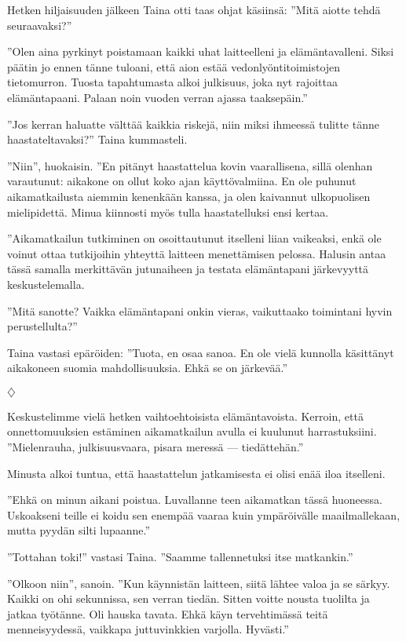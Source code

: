 ﻿\documentclass[a4paper, 12pt, finnish]{article}
\newcommand{\q}[1]{''#1''}
\newcommand{\openq}[1]{''#1} %
\def\jump{\vspace{2mm} \centerline{$\diamondsuit$} \vspace{2mm}}
\begin{document}
Hetken hiljaisuuden jälkeen Taina otti taas ohjat käsiinsä:
\q{Mitä aiotte tehdä seuraavaksi?}

\q{Olen aina pyrkinyt poistamaan kaikki uhat laitteelleni
ja elämäntavalleni. Siksi päätin jo ennen tänne tuloani, että
aion estää vedonlyöntitoimistojen tietomurron. Tuosta
tapahtumasta alkoi julkisuus, joka nyt rajoittaa elämäntapaani.
Palaan noin vuoden verran ajassa taaksepäin.}

\q{Jos kerran haluatte välttää kaikkia riskejä, niin miksi
ihmeessä tulitte tänne haastateltavaksi?} Taina kummasteli.

\q{Niin}, huokaisin. \openq{En pitänyt haastattelua kovin vaarallisena,
sillä olenhan varautunut: aikakone on ollut koko ajan käyttövalmiina.
En ole puhunut aikamatkailusta aiemmin 
kenenkään kanssa, ja olen kaivannut ulkopuolisen mielipidettä.
Minua kiinnosti myös tulla haastatelluksi ensi kertaa.}

\openq{Aikamatkailun tutkiminen on osoittautunut itselleni
liian vaikeaksi, enkä ole voinut ottaa tutkijoihin
yhteyttä laitteen menettämisen pelossa.
Halusin antaa tässä samalla merkittävän jutunaiheen ja
testata elämäntapani järkevyyttä keskustelemalla.}

\q{Mitä sanotte? Vaikka elämäntapani onkin vieras,
vaikuttaako toimintani hyvin perustellulta?}

Taina vastasi epäröiden: \q{Tuota, en osaa sanoa.
En ole vielä kunnolla käsittänyt aikakoneen suomia
mahdollisuuksia. Ehkä se on järkevää.}
 

\jump


Keskustelimme vielä hetken vaihtoehtoisista elämäntavoista.
Kerroin, että onnettomuuksien estäminen aikamatkailun
avulla ei kuulunut harrastuksiini. \q{Mielenrauha, julkisuusvaara,
pisara meressä --- tiedättehän.}

Minusta alkoi tuntua, että haastattelun jatkamisesta ei olisi
enää iloa itselleni.

\q{Ehkä on minun aikani poistua. Luvallanne teen aikamatkan tässä
huoneessa. Uskoakseni teille ei koidu sen enempää vaaraa kuin
ympäröivälle maailmallekaan, mutta pyydän silti lupaanne.}

\q{Tottahan toki!} vastasi Taina. \q{Saamme tallennetuksi itse matkankin.}

\q{Olkoon niin}, sanoin. \q{Kun käynnistän laitteen, siitä lähtee
valoa ja se särkyy. Kaikki on ohi sekunnissa, sen verran tiedän.
Sitten voitte nousta tuolilta ja jatkaa työtänne.
Oli hauska tavata. Ehkä käyn tervehtimässä teitä menneisyydessä,
vaikkapa juttuvinkkien varjolla. Hyvästi.}
\end{document}
